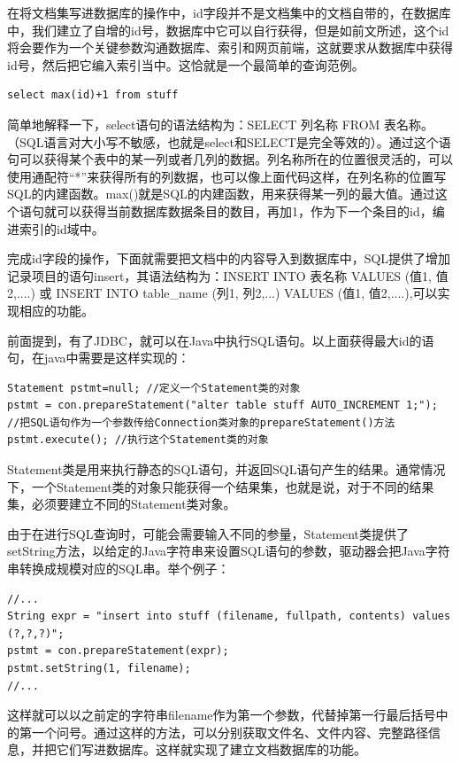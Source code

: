 \documentclass[12pt,a4paper]{article}
\begin{document}
	在将文档集写进数据库的操作中，id字段并不是文档集中的文档自带的，在数据库中，我们建立了自增的id号，数据库中它可以自行获得，但是如前文所述，这个id将会要作为一个关键参数沟通数据库、索引和网页前端，这就要求从数据库中获得id号，然后把它编入索引当中。这恰就是一个最简单的查询范例。
	
	\lstset{language=SQL,frame=lines}
	\begin{lstlisting}
select max(id)+1 from stuff
	\end{lstlisting}	
	
	简单地解释一下，select语句的语法结构为：SELECT 列名称 FROM 表名称。（SQL语言对大小写不敏感，也就是select和SELECT是完全等效的）。通过这个语句可以获得某个表中的某一列或者几列的数据。列名称所在的位置很灵活的，可以使用通配符“*”来获得所有的列数据，也可以像上面代码这样，在列名称的位置写SQL的内建函数。max()就是SQL的内建函数，用来获得某一列的最大值。通过这个语句就可以获得当前数据库数据条目的数目，再加1，作为下一个条目的id，编进索引的id域中。
	
	完成id字段的操作，下面就需要把文档中的内容导入到数据库中，SQL提供了增加记录项目的语句insert，其语法结构为：INSERT INTO 表名称 VALUES (值1, 值2,....)	或 INSERT INTO table\_{}name (列1, 列2,...) VALUES (值1, 值2,....),可以实现相应的功能。
	
	前面提到，有了JDBC，就可以在Java中执行SQL语句。以上面获得最大id的语句，在java中需要是这样实现的：
	\lstset{language=Java,frame=lines}
	\begin{lstlisting}
Statement pstmt=null; //定义一个Statement类的对象
pstmt = con.prepareStatement("alter table stuff AUTO_INCREMENT 1;");
//把SQL语句作为一个参数传给Connection类对象的prepareStatement()方法
pstmt.execute(); //执行这个Statement类的对象
	\end{lstlisting}	
	
	Statement类是用来执行静态的SQL语句，并返回SQL语句产生的结果。通常情况下，一个Statement类的对象只能获得一个结果集，也就是说，对于不同的结果集，必须要建立不同的Statement类对象。
	
	由于在进行SQL查询时，可能会需要输入不同的参量，Statement类提供了setString方法，以给定的Java字符串来设置SQL语句的参数，驱动器会把Java字符串转换成规模对应的SQL串。举个例子：
		\lstset{language=Java,frame=lines}
	\begin{lstlisting}
//...
String expr = "insert into stuff (filename, fullpath, contents) values (?,?,?)";
pstmt = con.prepareStatement(expr);
pstmt.setString(1, filename);
//...
	\end{lstlisting}	
	
	这样就可以以之前定的字符串filename作为第一个参数，代替掉第一行最后括号中的第一个问号。通过这样的方法，可以分别获取文件名、文件内容、完整路径信息，并把它们写进数据库。这样就实现了建立文档数据库的功能。
	
\end{document}
